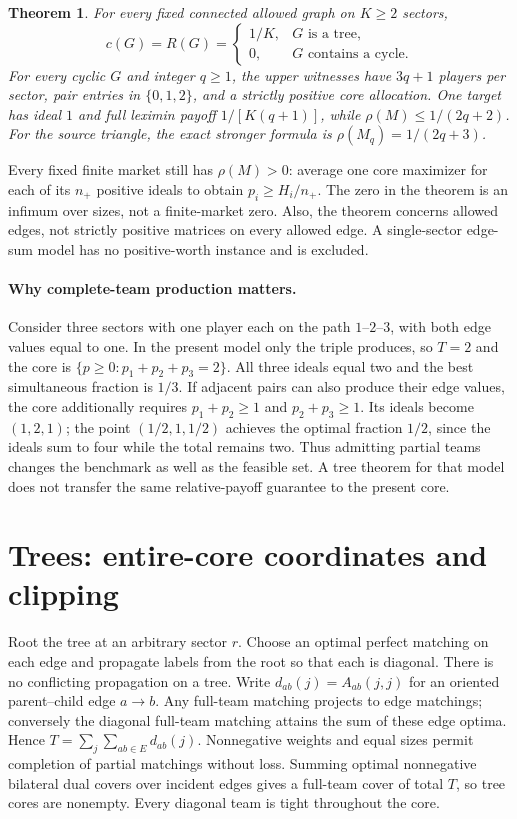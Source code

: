 \documentclass[11pt]{article}
\newtheorem{theorem}{Theorem}[section]
\theoremstyle{remark}\newtheorem{remark}[theorem]{Remark}
\begin{document}
\begin{theorem}\label{thm:main}
For every fixed connected allowed graph on $K\ge2$ sectors,
\[
 c(G)=R(G)=
 \begin{cases}1/K,&G\text{ is a tree},\\0,&G\text{ contains a cycle}.
 \end{cases}
\]
For every cyclic $G$ and integer $q\ge1$, the upper witnesses have $3q+1$
players per sector, pair entries in $\{0,1,2\}$, and a strictly positive
core allocation. One target has ideal $1$ and full leximin payoff
$1/[K(q+1)]$, while $\rho(M)\le1/(2q+2)$.
For the source triangle, the exact stronger formula is
$\rho(M_q)=1/(2q+3)$.
\end{theorem}

Every fixed finite market still has $\rho(M)>0$: average one core maximizer
for each of its $n_+$ positive ideals to obtain $p_i\ge H_i/n_+$.
The zero in the theorem is an infimum over sizes, not a finite-market zero.
Also, the theorem concerns allowed edges, not strictly positive matrices on
every allowed edge. A single-sector edge-sum model has no positive-worth
instance and is excluded.

\paragraph{Why complete-team production matters.}
Consider three sectors with one player each on the path $1$--$2$--$3$, with
both edge values equal to one. In the present model only the triple produces,
so $T=2$ and the core is $\{p\ge0:p_1+p_2+p_3=2\}$. All three ideals equal
two and the best simultaneous fraction is $1/3$. If adjacent pairs can also
produce their edge values, the core additionally requires
$p_1+p_2\ge1$ and $p_2+p_3\ge1$. Its ideals become $(1,2,1)$; the point
$(1/2,1,1/2)$ achieves the optimal fraction $1/2$, since the ideals sum to
four while the total remains two. Thus admitting partial teams changes the
benchmark as well as the feasible set. A tree theorem for that model does
not transfer the same relative-payoff guarantee to the present core.


\section{Trees: entire-core coordinates and clipping}
Root the tree at an arbitrary sector $r$. Choose an optimal perfect matching
on each edge and propagate labels from the root so that each is diagonal.
There is no conflicting propagation on a tree. Write $d_{ab}(j)=A_{ab}(j,j)$
for an oriented parent--child edge $a\to b$. Any full-team matching projects
to edge matchings; conversely the diagonal full-team matching attains the sum
of these edge optima. Hence
$T=\sum_j\sum_{ab\in E}d_{ab}(j)$.
Nonnegative weights and equal sizes permit completion of partial matchings
without loss. Summing optimal nonnegative bilateral dual covers over incident
edges gives a full-team cover of total $T$, so tree cores are nonempty.
Every diagonal team is tight throughout the core.
\end{document}
